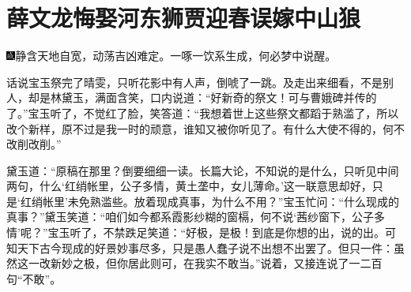 \chapter{薛文龙悔娶河东狮\hspace{.5em}贾迎春误嫁中山狼}

{\includegraphics[width=3mm]{../Images/00005}\kaishu 静含天地自宽，动荡吉凶难定。一啄一饮系生成，何必梦中说醒。}

话说宝玉祭完了晴雯，只听花影中有人声，倒唬了一跳。及走出来细看，不是别人，却是林黛玉，满面含笑，口内说道：“好新奇的祭文！可与曹娥碑并传的了。”宝玉听了，不觉红了脸，笑答道：“我想着世上这些祭文都蹈于熟滥了，所以改个新样，原不过是我一时的顽意，谁知又被你听见了。有什么大使不得的，何不改削改削。”

黛玉道：“原稿在那里？倒要细细一读。长篇大论，不知说的是什么，只听见中间两句，什么‘红绡帐里，公子多情，黄土垄中，女儿薄命。’这一联意思却好，只是‘红绡帐里’未免熟滥些。放着现成真事，为什么不用？”宝玉忙问：“什么现成的真事？”黛玉笑道：“咱们如今都系霞影纱糊的窗槅，何不说‘茜纱窗下，公子多情’呢？”宝玉听了，不禁跌足笑道：“好极，是极！到底是你想的出，说的出。可知天下古今现成的好景妙事尽多，只是愚人蠢子说不出想不出罢了。但只一件：虽然这一改新妙之极，但你居此则可，在我实不敢当。”说着，又接连说了一二百句“不敢”。

